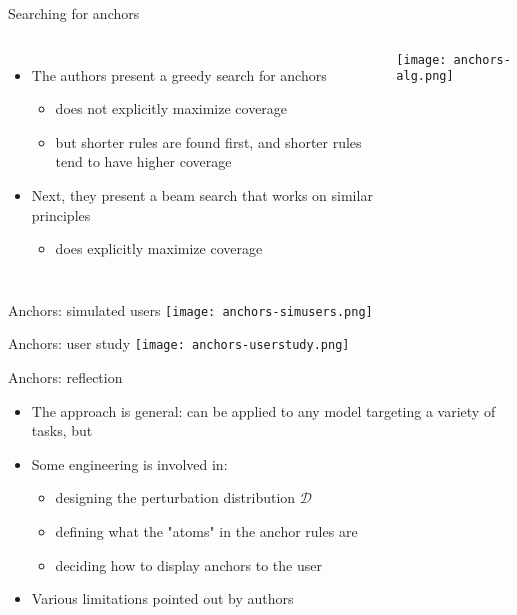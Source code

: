 \documentclass[aspectratio=169]{beamer}
\begin{document}
\begin{frame}{Searching for anchors}
\begin{columns}
	\begin{itemize}
		\item The authors present a greedy search for anchors
		\begin{itemize}
			\item does not explicitly maximize coverage
			\item but shorter rules are found first, and shorter rules tend to have higher coverage
		\end{itemize}
		\item Next, they present a beam search that works on similar principles
		\begin{itemize}
			\item does explicitly maximize coverage
		\end{itemize}
	\end{itemize}
	
	\texttt{[image: anchors-alg.png]}
\end{columns}
\end{frame}

\begin{frame}{Anchors: simulated users} \centering
\texttt{[image: anchors-simusers.png]}
\end{frame}
\begin{frame}{Anchors: user study} \centering
\texttt{[image: anchors-userstudy.png]}
\end{frame}


\begin{frame}{Anchors: reflection}
\begin{itemize}
	\item The approach is general: can be applied to any model targeting a variety of tasks, but
	\item Some engineering is involved in:
	\begin{itemize}
		\item designing the perturbation distribution $\mathcal D$
		\item defining what the "atoms" in the anchor rules are
		\item deciding how to display anchors to the user
	\end{itemize}
	\item Various limitations pointed out by authors
\end{itemize}
\end{frame}
\end{document}
